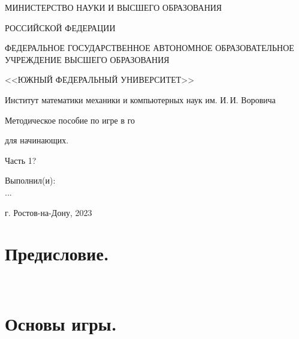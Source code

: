\documentclass[14pt,a4paper]{extarticle}
\begin{document}
\thispagestyle{empty}
\begin{center}
\small{МИНИСТЕРСТВО НАУКИ И ВЫСШЕГО ОБРАЗОВАНИЯ}\par
\small{РОССИЙСКОЙ ФЕДЕРАЦИИ}\par
\small{ФЕДЕРАЛЬНОЕ ГОСУДАРСТВЕННОЕ АВТОНОМНОЕ ОБРАЗОВАТЕЛЬНОЕ УЧРЕЖДЕНИЕ ВЫСШЕГО ОБРАЗОВАНИЯ}\par
\small{<<ЮЖНЫЙ ФЕДЕРАЛЬНЫЙ УНИВЕРСИТЕТ>>}\par
\normalsize{Институт математики механики и компьютерных наук им. И.\,И. Воровича}\par
\end{center}


\vspace*{5.0em plus 0.2em minus 0.2em}

\begin{center}
Методическое пособие по игре в го
\end{center}

\begin{center}
для начинающих.
\end{center}

\begin{center}
Часть 1?
\end{center}

\vspace*{5.0em plus 0.2em minus 0.2em}
\begin{flushright}
 Выполнил(и):\\
	...
\end{flushright}






\vspace*{\fill}

\begin{center}
г. Ростов-на-Дону, 2023
\end{center}

\newpage
\thispagestyle{empty}
\tableofcontents


\newpage

\section*{Предисловие.}
\

\newpage

\section*{Основы игры.}
\end{document}
